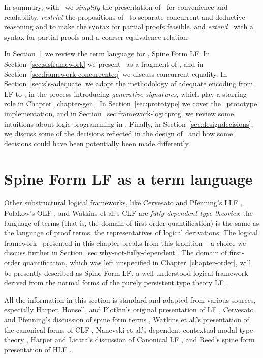 \smallskip
\noindent
In summary, with \sls~we {\it simplify} the presentation of \ollll~for
convenience and readability, {\it restrict} the propositions of
\ollll~to separate concurrent and deductive reasoning and to make the
syntax for partial proofs feasible, and {\it extend} \ollll~with a
syntax for partial proofs and a coarser equivalence relation.

In Section~\ref{sec:sls-termlanguage} we review
the term language for \sls, Spine Form LF.
%
In Section~\ref{sec:slsframework} we present \sls~as a fragment of
\ollll, and in Section~\ref{sec:framework-concurrenteq} we discuss
concurrent equality. 
%
In Section~\ref{sec:sls-adequate} we adopt the methodology of adequate
encoding from LF to \sls, in the process introducing {\it generative
  signatures}, which play a starring role in Chapter~\ref{chapter-gen}.
%
In Section~\ref{sec:prototype} we cover the \sls~prototype
implementation, and in Section~\ref{sec:framework-logicprog} we review
some intuitions about logic programming in \sls. 
%
Finally, in Section~\ref{sec:designdecisions}, we discuss some of the
decisions reflected in the design of \sls~and how some decisions could
have been potentially been made differently.

\section{Spine Form LF as a term language}
\label{sec:sls-termlanguage}

Other substructural logical frameworks, like Cervesato and Pfenning's
LLF \cite{cervesato02linear}, Polakow's OLF \cite{polakow01ordered},
and Watkins et al.'s CLF \cite{watkins02concurrent} are {\it
  fully-dependent type theories}: the language of terms (that is, the
domain of first-order quantification) is the same as the language of
proof terms, the representatives of logical derivations. 
The logical framework \sls~presented in this
chapter breaks from this tradition -- a choice we discuss further in
Section~\ref{sec:why-not-fully-dependent}. The domain of first-order
quantification, which was left unspecified in Chapter~\ref{chapter-order}, 
will be
presently described as Spine Form LF, a well-understood logical
framework derived from the normal forms of the purely persistent type
theory LF \cite{harper93framework}.

All the information in this section is standard and adapted from
various sources, especially Harper, Honsell, and Plotkin's original
presentation of LF \cite{harper93framework}, Cervesato and Pfenning's
discussion of spine form terms \cite{cervesato02linear}, Watkins et
al.'s presentation of the canonical forms of CLF
\cite{watkins02concurrent}, Nanevski et al.'s dependent contextual
modal type theory \cite{nanevski08contextual}, Harper and Licata's
discussion of Canonical LF \cite{harper07mechanizing}, and Reed's
spine form presentation of HLF \cite{reed09hybrid}.

